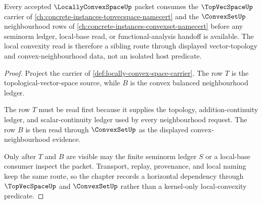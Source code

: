 \begin{theorem}
\label{thm:locally-convex-space-topvecspace-anchor}
Every accepted $\LocallyConvexSpaceUp$ packet consumes the $\TopVecSpaceUp$ carrier of \autoref{ch:concrete-instances-topvecspace-namecert} and the $\ConvexSetUp$ neighbourhood rows of \autoref{ch:concrete-instances-convexset-namecert} before any seminorm ledger, local-base read, or functional-analysis handoff is available. The local convexity read is therefore a sibling route through displayed vector-topology and convex-neighbourhood data, not an isolated host predicate.
\end{theorem}
\begin{proof}
Project the carrier of \autoref{def:locally-convex-space-carrier}. The row $T$ is the topological-vector-space source, while $B$ is the convex balanced neighbourhood ledger.

The row $T$ must be read first because it supplies the topology, addition-continuity ledger, and scalar-continuity ledger used by every neighbourhood request. The row $B$ is then read through $\ConvexSetUp$ as the displayed convex-neighbourhood evidence.

Only after $T$ and $B$ are visible may the finite seminorm ledger $S$ or a local-base consumer inspect the packet. Transport, replay, provenance, and local naming keep the same route, so the chapter records a horizontal dependency through $\TopVecSpaceUp$ and $\ConvexSetUp$ rather than a kernel-only local-convexity predicate.
\end{proof}
